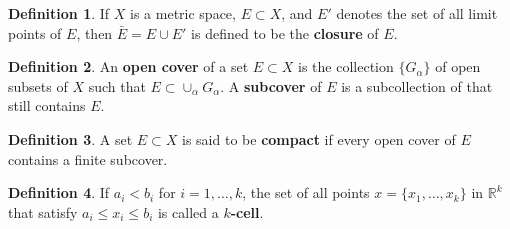 \documentclass[12pt]{article}
\theoremstyle{definition}
\newtheorem{definition}{Definition}
\theoremstyle{named}
\newcounter{customDef}
\begin{document}
\setcounter{customDef}{0}
\renewcommand{\thedefinition}{2.26}
\begin{definition}
    If $X$ is a metric space, $E \subset X$, and $E'$ denotes the set of all limit points of $E$, then $\bar{E} = E \cup E'$ is defined to be the \textbf{closure} of $E$.
\end{definition}

\setcounter{customDef}{0}
\renewcommand{\thedefinition}{2.31}
\begin{definition}
    An \textbf{open cover} of a set $E \subset X$ is the collection $\{G_\alpha\}$ of open subsets of $X$ such that $E \subset \cup_{\alpha}^{} G_\alpha$. A \textbf{subcover} of $E$ is a subcollection of that still contains $E$. 
\end{definition}

\setcounter{customDef}{0}
\renewcommand{\thedefinition}{2.32}
\begin{definition}
    A set $E \subset X$ is said to be \textbf{compact} if every open cover of $E$ contains a finite subcover. 
\end{definition}

\setcounter{customDef}{0}
\renewcommand{\thedefinition}{of $k$-cell}
\begin{definition}
    If $a_i < b_i$ for $i = 1,\dots,k$, the set of all points $x = \{x_1,\dots,x_k\}$ in $\mathbb{R}^k$ that satisfy $a_i \leq x_i \leq b_i$ is called a \textbf{$k$-cell}. 
\end{definition}
\end{document}
